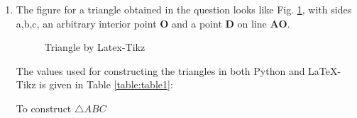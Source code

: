 \renewcommand{\vec}[1]{\mathbf{#1}}
    

\begin{enumerate}
\item
The figure for a triangle obtained in the question looks like Fig. \ref{fig:similar}, with sides a,b,c, an arbitrary interior point $\vec{O}$ and a point $\vec{D}$ on line $\vec{AO}$.  
\begin{figure}[!ht]
\centering
\resizebox{\columnwidth}{!}{}
\caption{Triangle by Latex-Tikz}
\label{fig:similar}	
\end{figure}

The values used for constructing the triangles in both Python and \LaTeX{}-Tikz is given in Table \ref{table:table1}:\\
\begin{table}[ht]
    \begin{center}
    	
  \caption{To construct $\triangle ABC$}
   \label{table:table1}
   \end{center}	
\end{table}

\end{enumerate}
